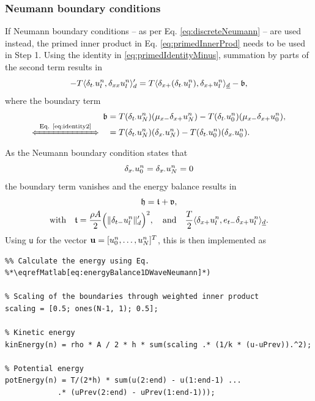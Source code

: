 {{{{\subsubsection{Neumann boundary conditions}
If Neumann boundary conditions -- as per Eq. \eqref{eq:discreteNeumann} -- are used instead, the primed inner product in Eq. \eqref{eq:primedInnerProd} needs to be used in Step 1. Using the identity in \eqref{eq:primedIdentityMinus}, summation by parts of the second term results in
\begin{equation*}
    - T \langle \delta_{t\cdot}u_l^n, \delta_{xx} u_l^n\rangle_d'  = T\langle \delta_{x+}(\delta_{t\cdot}u_l^n), \delta_{x+}u_l^n\rangle_{\underline{d}} - \mathfrak{b},
\end{equation*}
where the boundary term
\begin{align*}
    \mathfrak{b} &= T(\dtd u_N^n)(\mxm\dxp u_N^n) - T(\dtd u_0^n) (\mxm \dxp u_0^n),\\[-1em]
    \xLeftrightarrow{\mystrut\ \text{Eq. \eqref{eq:identity2}}\ } \quad &= T(\dtd u_N^n)(\dxd u_N^n) - T(\dtd u_0^n) (\dxd u_0^n).
\end{align*}
As the Neumann boundary condition states that
\begin{equation*}
    \delta_{x\cdot} u_0^n = \delta_{x\cdot} u_N^n = 0
\end{equation*}
the boundary term vanishes and the energy balance results in
%
\begin{equation}\label{eq:energyBalance1DWaveNeumann}
    \begin{gathered}
        \mathfrak{h} = \mathfrak{t} + \mathfrak{v},\\
        \text{with}\quad \mathfrak{t} = \frac{\rho A}{2}\Big(\lVert \delta_{t-} u_l^n \rVert'_d\Big)^2, \quad \text{and} \quad \frac{T}{2}\langle\delta_{x+}u_l^n, e_{t-}\delta_{x+}u_l^n\rangle_{\underline{d}}.
    \end{gathered}
\end{equation}
Using \texttt{u} for the vector $\mathbf{u} = [u_0^n, \hdots, u_N^n]^T$, this is then implemented as

\setlstMAT
\begin{lstlisting}
%% Calculate the energy using Eq. %*\eqrefMatlab[eq:energyBalance1DWaveNeumann]*) 

% Scaling of the boundaries through weighted inner product
scaling = [0.5; ones(N-1, 1); 0.5];

% Kinetic energy
kinEnergy(n) = rho * A / 2 * h * sum(scaling .* (1/k * (u-uPrev)).^2);

% Potential energy
potEnergy(n) = T/(2*h) * sum(u(2:end) - u(1:end-1) ...
            .* (uPrev(2:end) - uPrev(1:end-1)));


\end{lstlisting}}}}}
